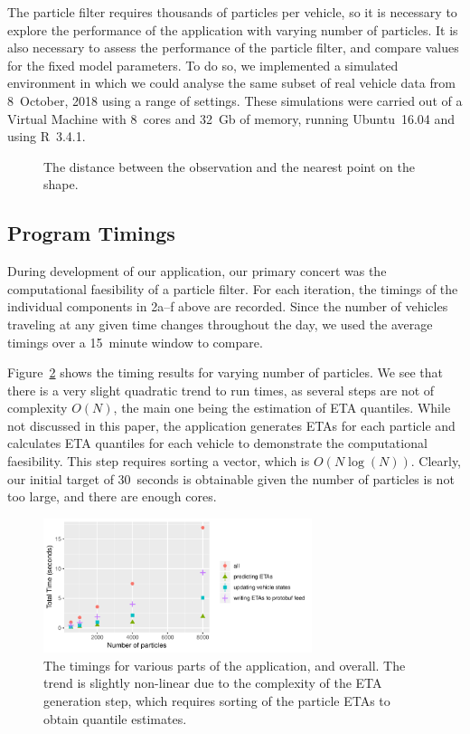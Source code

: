 The particle filter requires thousands of particles per vehicle,
so it is necessary to explore the performance of the application
with varying number of particles.
It is also necessary to assess the performance of the particle filter,
and compare values for the fixed model parameters.
To do so, we implemented a simulated \rt environment
in which we could analyse the same subset of real vehicle data from 8~October, 2018
using a range of settings.
These simulations were carried out of a Virtual Machine 
with 8~cores and 32~Gb of memory, 
running Ubuntu~16.04 and using R~3.4.1.

\begin{figure}[tb]
    \centering
    \caption{The distance between the observation and the nearest point on the shape.}
    \label{fig:gps_dist}
\end{figure}



\subsection{Program Timings}
\label{sec:timings}

During development of our application,
our primary concert was the computational faesibility of a particle filter.
For each iteration, 
the timings of the individual components in 2a--f above are recorded.
Since the number of vehicles traveling at any given time changes throughout the day,
we used the average timings over a 15~minute window to compare.


Figure~\ref{fig:timings} shows the timing results for varying number of particles.
We see that there is a very slight quadratic trend to run times,
as several steps are not of complexity $O(N)$,
the main one being the estimation of ETA quantiles.
While not discussed in this paper,
the application generates ETAs for each particle
and calculates ETA quantiles for each vehicle to demonstrate the computational faesibility.
This step requires sorting a vector, which is $O(N\log(N))$.
Clearly, our initial target of 30~seconds is obtainable given the number of particles
is not too large, and there are enough cores.


\begin{figure}[tb]
    \centering
    \includegraphics[width=0.7\textwidth]{figures/04_model_results_timing.pdf}
    \caption{The timings for various parts of the application, and overall. %
        The trend is slightly non-linear due to the complexity of the ETA generation step, %
        which requires sorting of the particle ETAs to obtain quantile estimates.}
    \label{fig:timings}
\end{figure}




